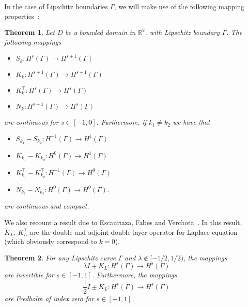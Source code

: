 \documentclass[11pt]{article}
\numberwithin{equation}{section}
\newtheorem{theorem}{Theorem}[section]
\begin{document}
In the case of Lipschitz boundaries $\Gamma$, we will make use of the following mapping properties~\cite{dominguez2016well}: 
\begin{theorem}\label{mapping}
  Let  $D$ be a bounded domain in $\mathbb{R}^2$, with Lipschitz boundary $\Gamma$. The following mappings
\begin{itemize}
\item $S_k:H^{s}(\Gamma)\to H^{s+1}(\Gamma)$
\item $K_k:H^{s+1}(\Gamma)\to H^{s+1}(\Gamma)$
\item $K^\top_k:H^{s}(\Gamma)\to H^{s}(\Gamma)$
\item $N_k:H^{s+1}(\Gamma)\to H^{s}(\Gamma)$
\end{itemize}
are continuous for $s\in[-1,0]$. Furthermore, if $k_1\ne k_2$ we have that  
\begin{itemize}
\item $S_{k_1}-S_{k_2}:H^{-1}(\Gamma)\to H^{1}(\Gamma)$
\item $K_{k_1}-K_{k_2}:H^{0}(\Gamma)\to H^{1}(\Gamma)$
\item $K^\top_{k_1}-K^\top_{k_2}:H^{-1}(\Gamma)\to H^{0}(\Gamma)$
\item $N_{k_1}-N_{k_2}:H^{0}(\Gamma)\to H^{0}(\Gamma)$.
\end{itemize}
are continuous and compact. 
\end{theorem}

We also recount a result due to Escauriaza, Fabes and Verchota~\cite{EsFaVer:1992}. In this result, $K_L$, $K_L^\top$ are the double and adjoint double layer operator for Laplace equation (which obviously correspond to $k=0$).

\begin{theorem}\label{theo:inv}
For any Lipschitz curve $\Gamma$ and  $\lambda\not\in [-1/2,1/2)$, the mappings
\[
 \lambda I+K_L :H^s(\Gamma)\to H^s(\Gamma)
\]
are invertible for $s\in[-1,1]$. Furthermore, the mappings
\[
\frac{1}{2}I\pm K_L:H^s(\Gamma)\to H^s(\Gamma)
\]
are Fredholm of index zero for $s\in[-1,1]$.
\end{theorem}
\end{document}
